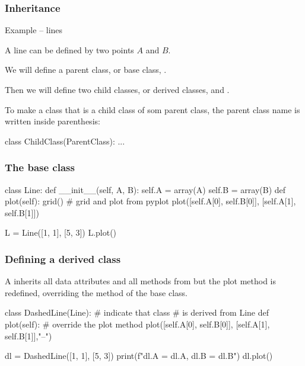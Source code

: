 \documentclass[hyperref={pdfpagelabels=false},table]{beamer}
\begin{document}
\begin{frame}[fragile]\frametitle{Inheritance}

Example -- lines

A line can be defined by two points $A$ and $B$.

We will define a parent class, or base class, .

  Then we will define two child classes, or derived classes,  and .

To make a class that is a child class of som parent class, the parent class name is written inside parenthesis:

\begin{python}
class ChildClass(ParentClass):
    ...
\end{python}    

\end{frame}
\begin{frame}[fragile]\frametitle{The base class}

\begin{python}
class Line:
    def __init__(self, A, B):
        self.A = array(A)
        self.B = array(B) 
    def plot(self):
        grid()  #  grid and plot from pyplot
        plot([self.A[0], self.B[0]], [self.A[1], self.B[1]])

L = Line([1, 1], [5, 3])
L.plot()
\end{python}

\end{frame}

\begin{frame}[fragile]\frametitle{Defining a derived class }

  A  inherits all data attributes and all methods 
  from  but the plot method is redefined, 
  overriding the method of the base class.

\begin{python}
class DashedLine(Line): # indicate that class 
                        # is derived from Line
    def plot(self):  # override the plot method
        plot([self.A[0], self.B[0]], [self.A[1], self.B[1]],"--")

dl = DashedLine([1, 1], [5, 3])
print(f"dl.A = {dl.A}, dl.B = {dl.B}")
dl.plot() 
\end{python}

\end{frame}
\end{document}

